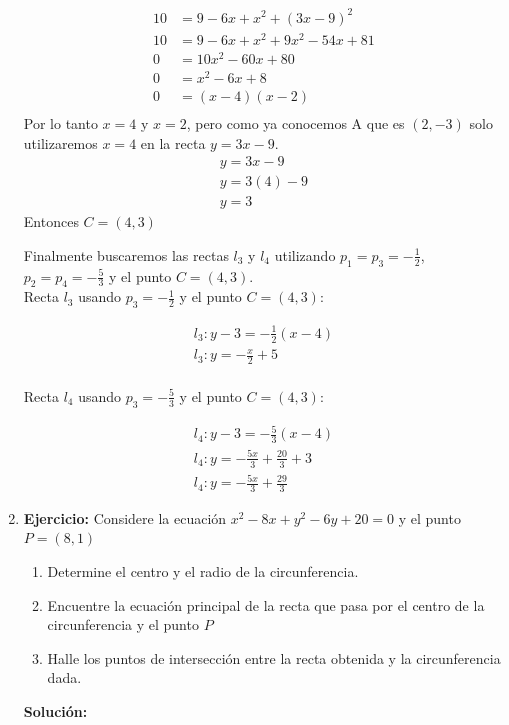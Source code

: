 \documentclass[a4paper,10pt]{article}
\begin{document}
\begin{enumerate}
\begin{align*}
10 &= 9 - 6x + x^2 + (3x-9)^2\\
10 &= 9 - 6x + x^2 + 9x^2 - 54x + 81\\
0  &= 10x^2  - 60x + 80\\
0  &= x^2  - 6x + 8\\
0  &= (x-4)(x-2)\\
\end{align*}
Por lo tanto $x= 4$ y $x = 2$, pero como ya conocemos A que es $(2,-3)$ solo utilizaremos $x=4$ en la recta $y=3x-9$.
 \begin{gather*}
y=3x-9\\
y= 3(4)-9\\
y= 3
\end{gather*}
Entonces $C=(4,3)$

\vspace{5mm}

Finalmente buscaremos las rectas $l_3$ y $l_4$ utilizando $p_1=p_3=-\frac{1}{2}$, $p_2=p_4=-\frac{5}{3}$ y el punto $C=(4,3)$.\\

Recta $l_3$ usando $p_3=-\frac{1}{2}$ y el punto $C=(4,3)$:

 \begin{gather*}
l_3: y-3 = -\frac{1}{2} (x-4)\\
l_3: y= -\frac{x}{2} +5\\
\end{gather*}

Recta $l_4$ usando $p_3=-\frac{5}{3}$ y el punto $C=(4,3)$:

 \begin{gather*}
l_4: y-3 = -\frac{5}{3} (x-4)\\
l_4: y= -\frac{5x}{3} +\frac{20}{3}+3\\
l_4: y= -\frac{5x}{3} +\frac{29}{3}
\end{gather*}

\newpage

\item \textbf{Ejercicio:} Considere la ecuación $x^2-8x+y^2-6y+20=0$ y el punto $P = (8,1)$ \\
\begin{enumerate}
\item Determine el centro y el radio de la circunferencia.
\item Encuentre la ecuación principal de la recta que pasa por el centro de la circunferencia y el punto $P$
\item Halle los puntos de intersección entre la recta obtenida y la circunferencia dada. 
\end{enumerate}
\textbf{Solución:}


\end{enumerate}
\end{document}
